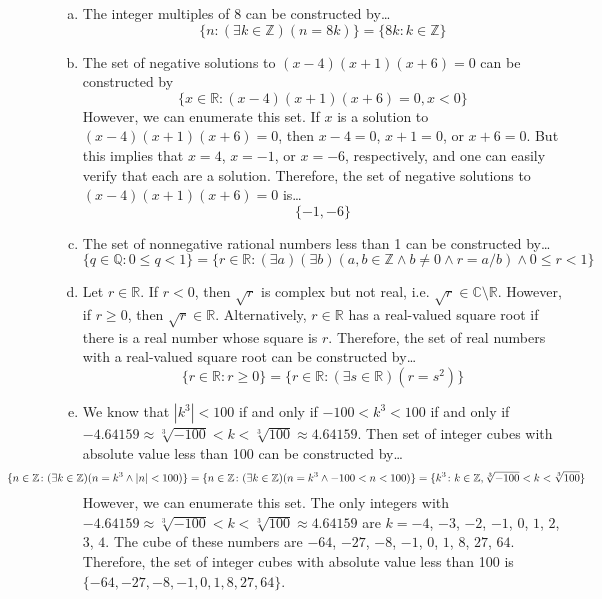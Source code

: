 \documentclass[11pt,letterpaper]{article}
\begin{document}
\sol 
\begin{enumerate}[(a)]
\item The integer multiples of 8 can be constructed by\dots
	\[
	\{ n \colon (\exists k \in \mathbb{Z})(n= 8k) \}= \{ 8k \colon k \in \mathbb{Z} \}
	\]

\item The set of negative solutions to $(x - 4)(x + 1)(x + 6)= 0$ can be constructed by 
	\[
	\{ x \in \mathbb{R} \colon (x - 4)(x + 1)(x + 6)= 0, x < 0 \}
	\]
However, we can enumerate this set. If $x$ is a solution to $(x - 4)(x + 1)(x + 6)= 0$, then $x - 4= 0$, $x + 1= 0$, or $x + 6= 0$. But this implies that $x= 4$, $x= -1$, or $x= -6$, respectively, and one can easily verify that each are a solution. Therefore, the set of negative solutions to $(x - 4)(x + 1)(x + 6)= 0$ is\dots
	\[
	\{ -1, -6 \}
	\]

\item The set of nonnegative rational numbers less than 1 can be constructed by\dots
	\[
	\{ q \in \mathbb{Q} \colon 0 \leq q < 1 \}= \{ r \in \mathbb{R} \colon (\exists a)(\exists b)(a, b \in \mathbb{Z} \wedge b \neq 0 \wedge r= a/b) \wedge 0 \leq r < 1 \}
	\]

\item Let $r \in \mathbb{R}$. If $r < 0$, then $\sqrt{r}$ is complex but not real, i.e. $\sqrt{r} \in \mathbb{C} \setminus \mathbb{R}$. However, if $r \geq 0$, then $\sqrt{r} \in \mathbb{R}$. Alternatively, $r \in \mathbb{R}$ has a real-valued square root if there is a real number whose square is $r$. Therefore, the set of real numbers with a real-valued square root can be constructed by\dots
	\[
	\{ r \in \mathbb{R} \colon r \geq 0 \}= \{ r \in \mathbb{R} \colon (\exists s \in \mathbb{R})(r= s^2) \}
	\]

\item We know that $|k^3| < 100$ if and only if $-100 < k^3 < 100$ if and only if $-4.64159 \approx \sqrt[3]{-100} < k < \sqrt[3]{100} \approx 4.64159$. Then set of integer cubes with absolute value less than 100 can be constructed by\dots
	\[
	\hspace{-2.5cm} \{ n \in \mathbb{Z} \colon (\exists k \in \mathbb{Z})(n= k^3 \wedge |n| < 100) \}= \{ n \in \mathbb{Z} \colon (\exists k \in \mathbb{Z})(n= k^3 \wedge -100 < n < 100) \}=  \{ k^3 \colon k \in \mathbb{Z}, \sqrt[3]{-100} < k < \sqrt[3]{100} \}
	\]
However, we can enumerate this set. The only integers with $-4.64159 \approx \sqrt[3]{-100} < k < \sqrt[3]{100} \approx 4.64159$ are $k= -4$, $-3$, $-2$, $-1$, $0$, $1$, $2$, $3$, $4$. The cube of these numbers are $-64$, $-27$, $-8$, $-1$, $0$, $1$, $8$, $27$, $64$. Therefore, the set of integer cubes with absolute value less than 100 is $\{ -64, -27, -8, -1, 0, 1, 8, 27, 64 \}$. 
\end{enumerate}
\end{document}
